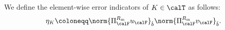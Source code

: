 \begin{defn} We define the element-wise error indicators of $K \in \calT$ as follows:
  \begin{equation}
    \label{eq:indicator}
    \eta_{K} \coloneqq \norm{\Pi_{\calF}^{R_{\textrm{m}}} u_{\calF}}_{\hat{b}} \norm{\Pi_{\calF}^{R_{\textrm{m}}} v_{\calF}}_{\hat{b}}.
  \end{equation}
\end{defn}

\pagebreak

%
%

